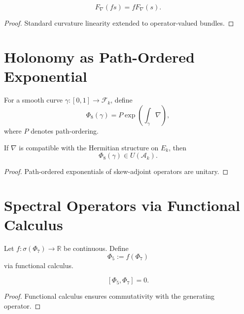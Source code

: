 \begin{lemma}
\[
F_\nabla(fs) = f F_\nabla(s).
\]
\end{lemma}

\begin{proof}
Standard curvature linearity extended to operator-valued bundles.
\end{proof}

\section{Holonomy as Path-Ordered Exponential}

\begin{definition}[Holonomy]
For a smooth curve $\gamma : [0,1] \to \mathcal{F}_k$, define
\[
\Phi_8(\gamma)
=
P\exp\left( \int_\gamma \nabla \right),
\]
where $P$ denotes path-ordering.
\end{definition}

\begin{lemma}
If $\nabla$ is compatible with the Hermitian structure on $E_k$, then
\[
\Phi_8(\gamma) \in U(\mathcal{A}_k).
\]
\end{lemma}

\begin{proof}
Path-ordered exponentials of skew-adjoint operators are unitary.
\end{proof}

\section{Spectral Operators via Functional Calculus}

\begin{definition}
Let $f : \sigma(\Phi_7) \to \mathbb{R}$ be continuous. Define
\[
\Phi_5 := f(\Phi_7)
\]
via functional calculus.
\end{definition}

\begin{lemma}
\[
[\Phi_5, \Phi_7] = 0.
\]
\end{lemma}

\begin{proof}
Functional calculus ensures commutativity with the generating operator.
\end{proof}


